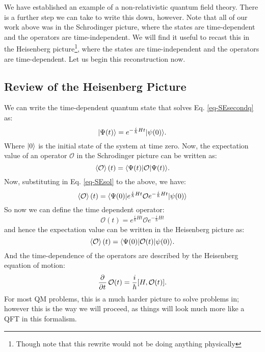 We have established an example of a non-relativistic quantum field theory. There is a further step we can take to write this down, however. Note that all of our work above was in the Schrodinger picture, where the states are time-dependent and the operators are time-independent. We will find it useful to recast this in the Heisenberg picture\footnote{Though note that this rewrite would not be doing anything physically}, where the states are time-independent and the operators are time-dependent. Let us begin this reconstruction now.

\subsection{Review of the Heisenberg Picture}
We can write the time-dependent quantum state that solves Eq. \eqref{eq-SEsecondq} as:
\begin{equation}\label{eq-SEsol}
    \lvert \Psi(t) \rangle = e^{-\frac{i}{\hbar}Ht}\lvert \psi(0) \rangle.
\end{equation}
Where $\lvert 0 \rangle$ is the initial state of the system at time zero. Now, the expectation value of an operator $\mathcal{O}$ in the Schrodinger picture can be written as:
\begin{equation}
    \left< \mathcal{O} \right>(t) = \langle \Psi(t) \rvert\mathcal{O}\lvert \Psi(t) \rangle.
\end{equation}
Now, substituting in Eq. \eqref{eq-SEsol} to the above, we have:
\begin{equation}
    \left< \mathcal{O} \right>(t) = \langle \Psi(0) \rvert e^{\frac{i}{\hbar}Ht}\mathcal{O}e^{-\frac{i}{\hbar}Ht}\lvert \psi(0) \rangle
\end{equation}
So now we can define the time dependent operator:
\begin{equation}
    \mathcal{O}(t) = e^{\frac{i}{\hbar}Ht}\mathcal{O}e^{-\frac{i}{\hbar}Ht}
\end{equation}
and hence the expectation value can be written in the Heisenberg picture as:
\begin{equation}
    \left< \mathcal{O} \right>(t) =\langle \Psi(0) \rvert\mathcal{O}(t)\lvert \psi(0) \rangle.
\end{equation}
And the time-dependence of the operators are described by the Heisenberg equation of motion:
\begin{equation}
    \dpd{}{t}\mathcal{O}(t) = \frac{i}{\hbar}[H, \mathcal{O}(t)].
\end{equation}
For most QM problems, this is a much harder picture to solve problems in; however this is the way we will proceed, as things will look much more like a QFT in this formalism.

